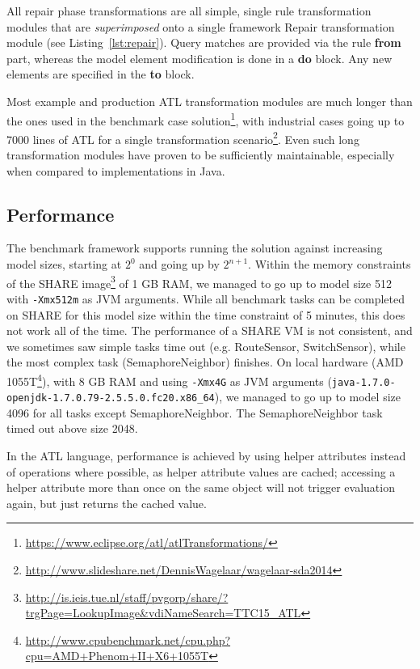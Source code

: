 \documentclass[submission,copyright,creativecommons]{eptcs}
\begin{document}
All repair phase transformations are all simple, single rule transformation modules that are \emph{superimposed} onto a single framework Repair transformation module (see Listing~\ref{lst:repair}). Query matches are provided via the rule \textbf{from} part, whereas the model element modification is done in a \textbf{do} block. Any new elements are specified in the \textbf{to} block.

Most example and production ATL transformation modules are much longer than the ones used in the benchmark case solution\footnote{\url{https://www.eclipse.org/atl/atlTransformations/}}, with industrial cases going up to 7000 lines of ATL for a single transformation scenario\footnote{\url{http://www.slideshare.net/DennisWagelaar/wagelaar-sda2014}}. Even such long transformation modules have proven to be sufficiently maintainable, especially when compared to implementations in Java.

\subsection{Performance}

The benchmark framework supports running the solution against increasing model sizes, starting at $2^0$ and going up by $2^{n+1}$. Within the memory constraints of the SHARE image\footnote{\url{http://is.ieis.tue.nl/staff/pvgorp/share/?trgPage=LookupImage&vdiNameSearch=TTC15_ATL}} of 1 GB RAM, we managed to go up to model size 512 with \texttt{-Xmx512m} as JVM arguments. While all benchmark tasks can be completed on SHARE for this model size within the time constraint of 5 minutes, this does not work all of the time. The performance of a SHARE VM is not consistent, and we sometimes saw simple tasks time out (e.g. RouteSensor, SwitchSensor), while the most complex task (SemaphoreNeighbor) finishes. On local hardware (AMD 1055T\footnote{\url{http://www.cpubenchmark.net/cpu.php?cpu=AMD+Phenom+II+X6+1055T}}), with 8 GB RAM and using \texttt{-Xmx4G} as JVM arguments (\texttt{java-1.7.0-openjdk-1.7.0.79-2.5.5.0.fc20.x86\_64}), we managed to go up to model size 4096 for all tasks except SemaphoreNeighbor. The SemaphoreNeighbor task timed out above size 2048.

In the ATL language, performance is achieved by using helper attributes instead of operations where possible, as helper attribute values are cached; accessing a helper attribute more than once on the same object will not trigger evaluation again, but just returns the cached value.
\end{document}

